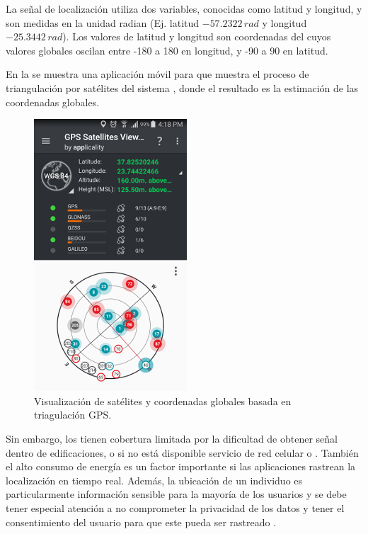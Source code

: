La señal de localización utiliza dos variables, conocidas como latitud
y longitud, y son medidas en la unidad radian (Ej. latitud $-57.2322\,rad$
y longitud $-25.3442\,rad$). Los valores de latitud y longitud son
coordenadas del  cuyos valores globales oscilan entre -180
a 180 en longitud, y -90 a 90 en latitud.

En la  se muestra una aplicación móvil para 
que muestra el proceso de triangulación por satélites del sistema
, donde el resultado es la estimación de las coordenadas
globales. 

\begin{figure}[!tbph]
\begin{centering}
\includegraphics[scale=0.8]{capitulo-4/graphics/gps}
\par\end{centering}
\caption[Coordenadas por GPS.]{\label{fig4:gps}Visualización de satélites y coordenadas globales
basada en triagulación GPS.}
\end{figure}

Sin embargo, los  tienen cobertura limitada por la dificultad
de obtener señal dentro de edificaciones, o si no está disponible
servicio de red celular o . También el alto consumo de
energía es un factor importante si las aplicaciones rastrean la localización
en tiempo real. Además, la ubicación de un individuo es particularmente
información sensible para la mayoría de los usuarios y se debe tener
especial atención a no comprometer la privacidad de los datos y tener
el consentimiento del usuario para que este pueda ser rastreado \cite{LaraLabrador2013}.

